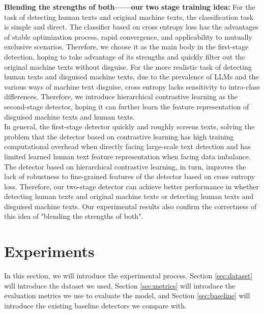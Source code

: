 \documentclass[11pt]{article}
\newcommand{\greenCitep}[1]{\textcolor{darkgreen}{\citep{#1}}}
\begin{document}
    \textbf{Blending the strengths of both——our two stage training idea:} For the task of detecting human texts and original machine texts, the classification task is simple and direct. The classifier based on cross entropy loss has the advantages of stable optimization process, rapid convergence, and applicability to mutually exclusive scenarios\greenCitep{Dickson2022crossentry,ma2022crossentry,wood2022biasvariance}. Therefore, we choose it as the main body in the first-stage detection, hoping to take advantage of its strengths and quickly filter out the original machine texts without disguise. For the more realistic task of detecting human texts and disguised machine texts, due to the prevalence of LLMs and the various ways of machine text disguise, cross entropy lacks sensitivity to intra-class differences\greenCitep{liu2016largemarginsoftmax,Sun2020circleloss}. Therefore, we introduce hierarchical contrastive learning as the second-stage detector, hoping it can further learn the feature representation of disguised machine texts and human texts.\\
		In general, the first-stage detector quickly and roughly screens texts, solving the problem that the detector based on contrastive learning has high training computational overhead when directly facing large-scale text detection and has limited learned human text feature representation when facing data imbalance\greenCitep{liu2016largemarginsoftmax,sohn2016contrasive}. The detector based on hierarchical contrastive learning, in turn, improves the lack of robustness to fine-grained features of the detector based on cross entropy loss. Therefore, our two-stage detector can achieve better performance in whether detecting human texts and original machine texts or detecting human texts and disguised machine texts. Our experimental results also confirm the correctness of this idea of "blending the strengths of both".
	\section{Experiments}
	In this section, we will introduce the experimental process. Section \ref{sec:dataset} will introduce the dataset we used, Section \ref{sec:metrics} will introduce the evaluation metrics we use to evaluate the model, and Section \ref{sec:baseline} will introduce the existing baseline detectors we compare with.
\end{document}
